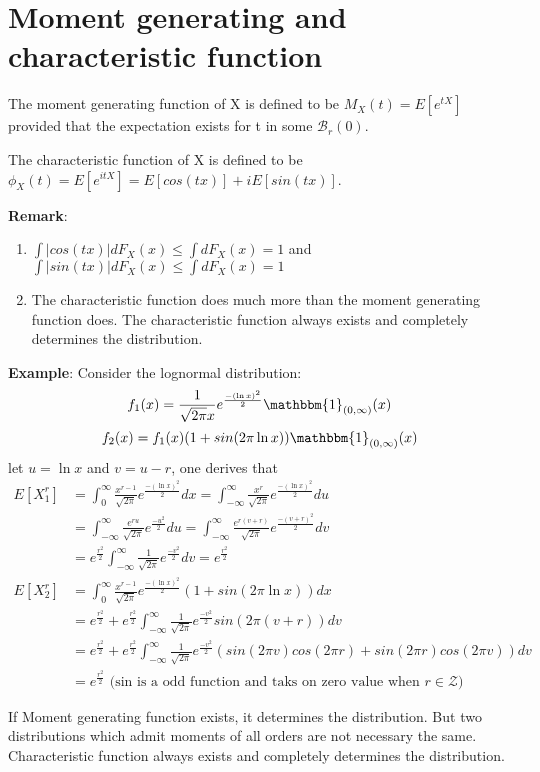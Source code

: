 \documentclass[../Transformation.tex]{subfiles}
\begin{document}
\section{Moment generating and characteristic function}
\begin{definition}
The moment generating function of X is defined to be $M_X(t)=E[e^{tX}]$ provided that the expectation exists for t in some $\mathcal{B}_r(0)$.
\end{definition}
\begin{definition}
The characteristic function of X is defined to be $\phi_X(t)=E[e^{itX}]=E[cos(tx)]+iE[sin(tx)]$. 
\end{definition}
{\bf Remark}:
\begin{enumerate}
\item $\int|cos(tx)|dF_X(x)\leq\int dF_X(x)=1$ and $\int|sin(tx)|dF_X(x)\leq\int dF_X(x)=1$
\item The characteristic function does much more than the moment generating function does. The characteristic function always exists and completely determines the distribution.
\end{enumerate}
{\bf Example}:
Consider the lognormal distribution: $$f_1(x)=\frac{1}{\sqrt{2\pi}x}e^{\frac{-(\ln x)^2}{2}}\mathbbm{1}_{(0,\infty)}(x)$$
$$f_2(x)=f_1(x)(1+sin(2\pi\ln x))\mathbbm{1}_{(0,\infty)}(x)$$
let $u=\ln x$ and $v=u-r$, one derives that
\begin{align*}
E[X_1^r]&=\int_0^\infty\frac{x^{r-1}}{\sqrt{2\pi}}e^{\frac{-(\ln x)^2}{2}}dx
=\int_{-\infty}^\infty\frac{x^r}{\sqrt{2\pi}}e^{\frac{-(\ln x)^2}{2}}du\\
&=\int_{-\infty}^\infty\frac{e^{ru}}{\sqrt{2\pi}}e^{\frac{-u^2}{2}}du=\int_{-\infty}^\infty\frac{e^{r(v+r)}}{\sqrt{2\pi}}e^{\frac{-(v+r)^2}{2}}dv\\
&=e^{\frac{r^2}{2}}\int_{-\infty}^{\infty}\frac{1}{\sqrt{2\pi}}e^{\frac{-v^2}{2}}dv=e^{\frac{r^2}{2}}\\
E[X_2^r]&=\int_0^\infty\frac{x^{r-1}}{\sqrt{2\pi}}e^{\frac{-(\ln x)^2}{2}}(1+sin(2\pi\ln x))dx
\\
&=e^{\frac{r^2}{2}}+e^{\frac{r^2}{2}}\int_{-\infty}^{\infty}\frac{1}{\sqrt{2\pi}}e^{\frac{-v^2}{2}}sin(2\pi (v+r))dv\\
&=e^{\frac{r^2}{2}}+e^{\frac{r^2}{2}}\int_{-\infty}^{\infty}\frac{1}{\sqrt{2\pi}}e^{\frac{-v^2}{2}}(sin(2\pi v)cos(2\pi r)+sin(2\pi r)cos(2\pi v))dv\\
&=e^{\frac{r^2}{2}} \mbox{ (sin is a odd function and taks on zero value when $r\in\mathcal{Z}$)}
\end{align*}
\begin{intuition}
If Moment generating function exists, it determines the distribution. But two distributions which admit moments of all orders are not necessary the same. Characteristic function always exists and completely determines the distribution.
\end{intuition}
\end{document}
